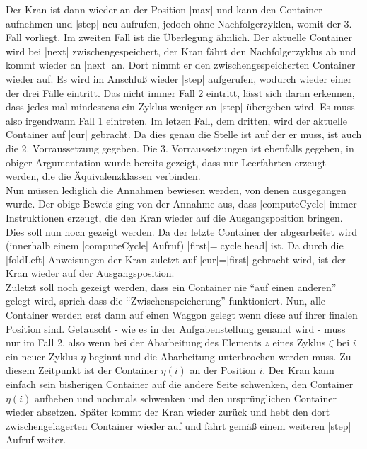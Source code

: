 Der Kran ist dann wieder an der Position |max| und kann den Container aufnehmen und |step| neu aufrufen, jedoch ohne Nachfolgerzyklen, womit der 3. Fall vorliegt.
Im zweiten Fall ist die Überlegung ähnlich. Der aktuelle Container wird bei |next| zwischengespeichert, der Kran fährt den Nachfolgerzyklus ab und kommt wieder an |next| an.
Dort nimmt er den zwischengespeicherten Container wieder auf.
Es wird im Anschluß wieder |step| aufgerufen, wodurch wieder einer der drei Fälle eintritt.
Das nicht immer Fall 2 eintritt, lässt sich daran erkennen, dass jedes mal mindestens ein Zyklus weniger an |step| übergeben wird.
Es muss also irgendwann Fall 1 eintreten.
Im letzen Fall, dem dritten, wird der aktuelle Container auf |cur| gebracht.
Da dies genau die Stelle ist auf der er muss, ist auch die 2. Vorraussetzung gegeben.
Die 3. Vorraussetzungen ist ebenfalls gegeben, in obiger Argumentation wurde bereits gezeigt, dass nur Leerfahrten erzeugt werden, die die Äquivalenzklassen verbinden.
\\%
Nun müssen lediglich die Annahmen bewiesen werden, von denen ausgegangen wurde.
Der obige Beweis ging von der Annahme aus, dass |computeCycle| immer Instruktionen erzeugt, die den Kran wieder auf die Ausgangsposition bringen.
Dies soll nun noch gezeigt werden. Da der letzte Container der abgearbeitet wird (innerhalb einem |computeCycle| Aufruf) |first|=|cycle.head| ist.
Da durch die |foldLeft| Anweisungen der Kran zuletzt auf |cur|=|first| gebracht wird, ist der Kran wieder auf der Ausgangsposition.\\
Zuletzt soll noch gezeigt werden, dass ein Container nie ``auf einen anderen'' gelegt wird, sprich dass die ``Zwischenspeicherung'' funktioniert.
Nun, alle Container werden erst dann auf einen Waggon gelegt wenn diese auf ihrer finalen Position sind.
Getauscht - wie es in der Aufgabenstellung genannt wird - muss nur im Fall 2,
also wenn bei der Abarbeitung des Elements $z$ eines Zyklus $\zeta$ bei $i$ ein neuer Zyklus $\eta$ beginnt und die Abarbeitung unterbrochen werden muss.
Zu diesem Zeitpunkt ist der Container $\eta(i)$ an der Position $i$. Der Kran kann einfach sein bisherigen Container auf die andere Seite schwenken, den Container $\eta(i)$
aufheben und nochmals schwenken und den ursprünglichen Container wieder absetzen.
Später kommt der Kran wieder zurück und hebt den dort zwischengelagerten Container wieder auf und fährt gemäß einem weiteren |step| Aufruf weiter.\\

